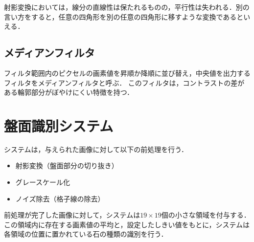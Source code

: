 \documentclass[summary]{nitocs}
\numberwithin{equation}{section}
\begin{document}
            射影変換においては，線分の直線性は保たれるものの，平行性は失われる．別の言い方をすると，任意の四角形を別の任意の四角形に移すような変換であるといえる．

        \subsection{メディアンフィルタ}
            フィルタ範囲内のピクセルの画素値を昇順か降順に並び替え，中央値を出力するフィルタをメディアンフィルタと呼ぶ\cite{DIP}．
            このフィルタは，コントラストの差がある輪郭部分がぼやけにくい特徴を持つ．


    \section{盤面識別システム} \label{system}
        システムは，与えられた画像に対して以下の前処理を行う．
        \begin{itemize}
            \item 射影変換（盤面部分の切り抜き）
            \item グレースケール化
            \item ノイズ除去（格子線の除去）
        \end{itemize}
        前処理が完了した画像に対して，システムは$19\times19$個の小さな領域を付与する．
        この領域内に存在する画素値の平均と，設定したしきい値をもとに，システムは各領域の位置に置かれている石の種類の識別を行う．
\end{document}
